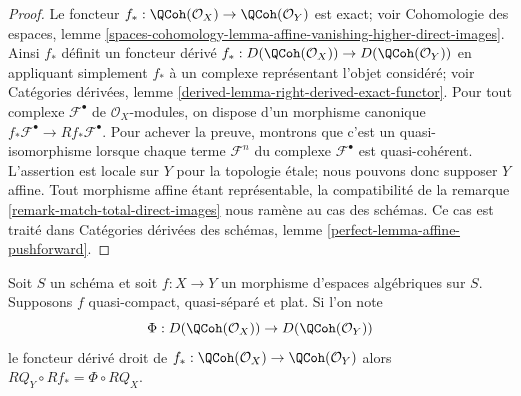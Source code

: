 \begin{proof}
Le foncteur
$f_* : \QCoh(\mathcal{O}_X) \to \QCoh(\mathcal{O}_Y)$
est exact; voir Cohomologie des espaces, lemme
\ref{spaces-cohomology-lemma-affine-vanishing-higher-direct-images}.
Ainsi $f_*$ d\'efinit un foncteur d\'eriv\'e
$f_* : D(\QCoh(\mathcal{O}_X)) \to D(\QCoh(\mathcal{O}_Y))$ en appliquant
simplement $f_*$ \`a un complexe repr\'esentant l'objet consid\'er\'e; voir
Cat\'egories d\'eriv\'ees, lemme
\ref{derived-lemma-right-derived-exact-functor}. Pour tout complexe
$\mathcal{F}^\bullet$ de $\mathcal{O}_X$-modules, on dispose d'un morphisme
canonique
$f_*\mathcal{F}^\bullet \to Rf_*\mathcal{F}^\bullet$.
Pour achever la preuve, montrons que c'est un quasi-isomorphisme lorsque
chaque terme $\mathcal{F}^n$ du complexe $\mathcal{F}^\bullet$ est
quasi-coh\'erent. L'assertion est locale sur $Y$ pour la topologie \'etale;
nous pouvons donc supposer $Y$ affine. Tout morphisme affine \'etant
repr\'esentable, la compatibilit\'e de la
remarque \ref{remark-match-total-direct-images} nous ram\`ene au cas des
sch\'emas. Ce cas est trait\'e dans Cat\'egories d\'eriv\'ees des sch\'emas,
lemme \ref{perfect-lemma-affine-pushforward}.
\end{proof}

\begin{lemma}
\label{lemma-flat-pushforward-coherator}
Soit $S$ un sch\'ema et soit $f : X \to Y$ un morphisme d'espaces alg\'ebriques
sur $S$. Supposons $f$ quasi-compact, quasi-s\'epar\'e et plat. Si l'on note
$$
\Phi : D(\QCoh(\mathcal{O}_X)) \to D(\QCoh(\mathcal{O}_Y))
$$
le foncteur d\'eriv\'e droit de
$f_* : \QCoh(\mathcal{O}_X) \to \QCoh(\mathcal{O}_Y)$
alors $RQ_Y \circ Rf_* = \Phi \circ RQ_X$.
\end{lemma}

